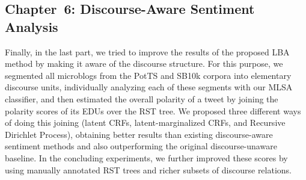 \documentclass[11pt]{article}
\begin{document}
\subsection{Chapter~6: Discourse-Aware Sentiment Analysis}

Finally, in the last part, we tried to improve the results of the
proposed LBA method by making it aware of the discourse structure.
For this purpose, we segmented all microblogs from the PotTS and SB10k
corpora into elementary discourse units, individually analyzing each
of these segments with our MLSA classifier, and then estimated the
overall polarity of a tweet by joining the polarity scores of its EDUs
over the RST tree.  We proposed three different ways of doing this
joining (latent CRFs, latent-marginalized CRFs, and Recursive
Dirichlet Process), obtaining better results than existing
discourse-aware sentiment methods and also outperforming the original
discourse-unaware baseline.  In the concluding experiments, we further
improved these scores by using manually annotated RST trees and richer
subsets of discourse relations.
\end{document}
